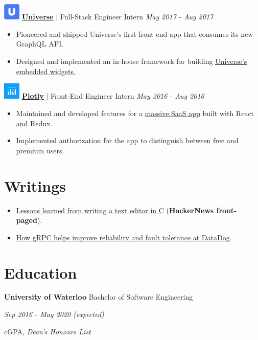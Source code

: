 \documentclass[paper=a4,fontsize=15pt]{scrartcl}
\newcommand{\quarterspace}{\vspace*{0.25em}}
\newcommand{\fullspace}{\vspace*{1em}}
\begin{document}
\fullspace
\noindent \includegraphics[width=0.8cm, height=0.8cm]{assets/universe.png}
\normalsize
\noindent \href{https://universe.com}{\ul{\textbf{Universe}}}
$\vert$ \small Full-Stack Engineer Intern
{\hfill \footnotesize \textit{May 2017 - Aug 2017}}
\begin{itemize}[noitemsep,leftmargin=20pt,label=\raisebox{0.25ex}{\tiny$\bullet$},topsep=5pt]
  \small
  \item Pioneered and shipped Universe's first front-end app that consumes its
    new GraphQL API.
  \item Designed and implemented an in-house framework for building
    \href{https://www.universe.com/sell-tickets-on-your-website-with-universe-widgets}{\ul{Universe's
        embedded widgets}.}
\end{itemize}

\fullspace
\noindent \includegraphics[width=0.8cm, height=0.8cm]{assets/plotly.png}
\normalsize
\noindent \href{https://plot.ly}{\textbf{\ul{Plotly}}}
$\vert$ \small Front-End Engineer Intern
{\hfill \footnotesize \textit{May 2016 - Aug 2016}}
\begin{itemize}[noitemsep,leftmargin=20pt,label=\raisebox{0.25ex}{\tiny$\bullet$},topsep=5pt]
  \small
  \item Maintained and developed features for a
    \href{https://plot.ly/online-chart-maker/}{\ul{massive SaaS app}} built with
    React and Redux.
  \item Implemented authorization for the app to distinguish between free and
    premium users.
\end{itemize}

\section*{Writings}{}
\begin{itemize}[noitemsep,leftmargin=20pt,label=\raisebox{0.25ex}{\tiny$\bullet$},topsep=5pt]
  \small
  \item \href{http://lpan.io/what-i-learnt-from-viw}{\ul{Lessons learned from
        writing a text editor in C}} (\textbf{HackerNews front-paged}).
  \item \href{http://lpan.io/migrating-to-grpc}{\ul{How gRPC helps improve
        reliability and fault tolerance at DataDog}}.
\end{itemize}

\section*{Education}{}
\noindent \textbf{University of Waterloo} Bachelor of Software Engineering \par
\quarterspace
\footnotesize
\noindent \textit{Sep 2016 - May 2020 (expected)} \par
{} cGPA, \textit{Dean's Honours List}
\end{document}
